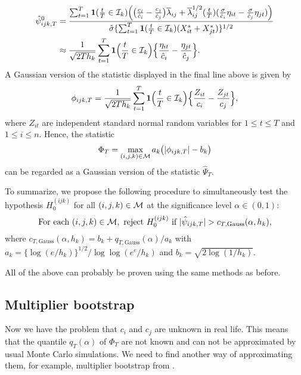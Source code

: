 \documentclass[a4paper,11pt]{article}
\numberwithin{equation}{section}
\begin{document}
\begin{align*}
\hat{\psi}_{ijk,T}^{0} &= \frac{\sum\nolimits_{t=1}^T \boldsymbol{1}(\frac{t}{T} \in \mathcal{I}_k) \Big(\big( \frac{c_i}{\hat{c}_i} - \frac{c_j}{\hat{c}_j} \big)\overline{\lambda}_{ij} + \overline{\lambda}_{ij}^{1/2}(\frac{t}{T}) (\frac{\sigma}{\hat{c}_i} \eta_{it} - \frac{\sigma}{\hat{c}_j} \eta_{jt}) \Big)}{ \hat{\sigma} \{ \sum\nolimits_{t=1}^T \boldsymbol{1}(\frac{t}{T} \in \mathcal{I}_k) (X^*_{it} + X^*_{jt}) \}^{1/2}}\\
 & \approx \frac{1}{\sqrt{2Th_k}} \sum\limits_{t=1}^T \boldsymbol{1}\Big(\frac{t}{T} \in \mathcal{I}_k\Big) \Big\{ \frac{\eta_{it}}{\hat{c}_i} - \frac{\eta_{jt}}{\hat{c}_j} \Big\}.
\end{align*} 
A Gaussian version of the statistic displayed in the final line above is given by 
\begin{equation*}
\phi_{ijk,T} = \frac{1}{\sqrt{2Th_k}} \sum\limits_{t=1}^T \boldsymbol{1}\Big(\frac{t}{T} \in \mathcal{I}_k\Big) \Big\{ \frac{Z_{it}}{c_i} - \frac{Z_{jt}}{c_j} \Big\},
\end{equation*}
where $Z_{it}$ are independent standard normal random variables for $1 \le t \le T$ and $1 \le i \le n$. Hence, the statistic 
\[ \Phi_T = \max_{(i,j,k) \in \mathcal{M}} a_k \big( |\phi_{ijk,T}| - b_k \big) \]
can be regarded as a Gaussian version of the statistic $\hat{\Psi}_T$. 


To summarize, we propose the following procedure to simultaneously test the hypothesis $H_0^{(ijk)}$ for all $(i,j,k) \in \mathcal{M}$ at the significance level $\alpha \in (0,1)$: 
\begin{equation}\label{eq:test}
\text{For each } (i,j,k) \in \mathcal{M}, \text{ reject } H_0^{(ijk)} \text{ if } |\hat{\psi}_{ijk,T}| > c_{T,\text{Gauss}}(\alpha,h_k),
\end{equation}
where $c_{T,\text{Gauss}}(\alpha,h_k) = b_k + q_{T,\text{Gauss}}(\alpha)/a_k$ with $a_k = \{\log(e/h_k)\}^{1/2} / \log \log(e^e / h_k)$ and $b_k = \sqrt{2 \log(1/h_k)}$. 

{\color{red}
All of the above can probably be proven using the same methods as before.
}

\subsection{Multiplier bootstrap}

Now we have the problem that $c_i$ and $c_j$ are unknown in real life. This means that the quantile $q_T(\alpha)$ of $\Phi_T$ are not known and can not be approximated by usual Monte Carlo simulations. We need to find another way of approximating them, for example, multiplier bootstrap from \cite{Chernozhukov2017}.
\end{document}
